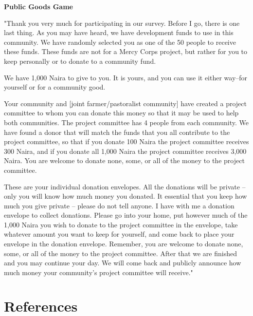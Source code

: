\documentclass[11pt]{article}
\begin{document}
\textbf{Public Goods Game}

"Thank you very much for participating in our survey. Before I go, there
is one last thing. As you may have heard, we have development funds to
use in this community. We have randomly selected you as one of the 50
people to receive these funds. These funds are not for a Mercy Corps
project, but rather for you to keep personally or to donate to a
community fund.

We have 1,000 Naira to give to you. It is yours, and you can use it
either way--for yourself or for a community good.

Your community and {[}joint farmer/pastoralist community{]} have created
a project committee to whom you can donate this money so that it may be
used to help both communities. The project committee has 4 people from
each community. We have found a donor that will match the funds that you
all contribute to the project committee, so that if you donate 100 Naira
the project committee receives 300 Naira, and if you donate all 1,000
Naira the project committee receives 3,000 Naira. You are welcome to
donate none, some, or all of the money to the project committee.

These are your individual donation envelopes. All the donations will be
private -- only you will know how much money you donated. It essential
that you keep how much you give private -- please do not tell anyone. I
have with me a donation envelope to collect donations. Please go into
your home, put however much of the 1,000 Naira you wish to donate to the
project committee in the envelope, take whatever amount you want to keep
for yourself, and come back to place your envelope in the donation
envelope. Remember, you are welcome to donate none, some, or all of the
money to the project committee. After that we are finished and you may
continue your day. We will come back and publicly announce how much
money your community's project committee will receive."

\hypertarget{references}{%
\section*{References}\label{references}}
\end{document}
